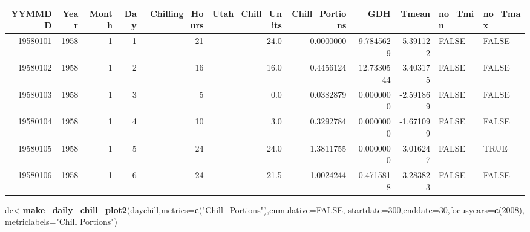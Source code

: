\documentclass[
]{book}
\newenvironment{Shaded}{\begin{snugshade}}{\end{snugshade}}
\newcommand{\DataTypeTok}[1]{\textcolor[rgb]{0.13,0.29,0.53}{#1}}
\newcommand{\DecValTok}[1]{\textcolor[rgb]{0.00,0.00,0.81}{#1}}
\newcommand{\KeywordTok}[1]{\textcolor[rgb]{0.13,0.29,0.53}{\textbf{#1}}}
\newcommand{\NormalTok}[1]{#1}
\newcommand{\OperatorTok}[1]{\textcolor[rgb]{0.81,0.36,0.00}{\textbf{#1}}}
\newcommand{\OtherTok}[1]{\textcolor[rgb]{0.56,0.35,0.01}{#1}}
\newcommand{\StringTok}[1]{\textcolor[rgb]{0.31,0.60,0.02}{#1}}
\begin{document}
\begin{Shaded}
\end{Shaded}

\begingroup\fontsize{8}{10}\selectfont

\begin{tabular}{r|r|r|r|r|r|r|r|r|l|l}
\hline
YYMMDD & Year & Month & Day & Chilling\_Hours & Utah\_Chill\_Units & Chill\_Portions & GDH & Tmean & no\_Tmin & no\_Tmax\\
\hline
19580101 & 1958 & 1 & 1 & 21 & 24.0 & 0.0000000 & 9.7845629 & 5.391122 & FALSE & FALSE\\
\hline
19580102 & 1958 & 1 & 2 & 16 & 16.0 & 0.4456124 & 12.7330544 & 3.403175 & FALSE & FALSE\\
\hline
19580103 & 1958 & 1 & 3 & 5 & 0.0 & 0.0382879 & 0.0000000 & -2.591869 & FALSE & FALSE\\
\hline
19580104 & 1958 & 1 & 4 & 10 & 3.0 & 0.3292784 & 0.0000000 & -1.671099 & FALSE & FALSE\\
\hline
19580105 & 1958 & 1 & 5 & 24 & 24.0 & 1.3811755 & 0.0000000 & 3.016247 & FALSE & TRUE\\
\hline
19580106 & 1958 & 1 & 6 & 24 & 21.5 & 1.0024244 & 0.4715818 & 3.283823 & FALSE & FALSE\\
\hline
\end{tabular}
\endgroup{}

\begin{Shaded}
\begin{Highlighting}[]
\NormalTok{dc<-}\KeywordTok{make_daily_chill_plot2}\NormalTok{(daychill,}\DataTypeTok{metrics=}\KeywordTok{c}\NormalTok{(}\StringTok{"Chill_Portions"}\NormalTok{),}\DataTypeTok{cumulative=}\OtherTok{FALSE}\NormalTok{,}
   \DataTypeTok{startdate=}\DecValTok{300}\NormalTok{,}\DataTypeTok{enddate=}\DecValTok{30}\NormalTok{,}\DataTypeTok{focusyears=}\KeywordTok{c}\NormalTok{(}\DecValTok{2008}\NormalTok{), }\DataTypeTok{metriclabels=}\StringTok{"Chill Portions"}\NormalTok{)}
\end{Highlighting}
\end{Shaded}
\end{document}
